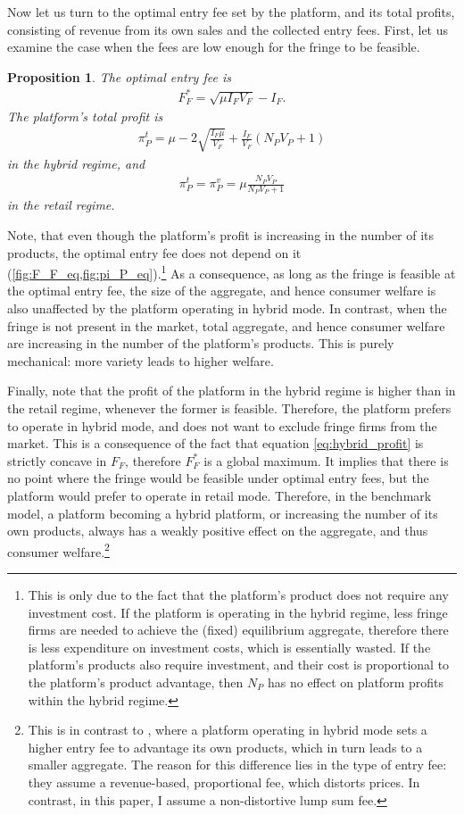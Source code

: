 \documentclass[a4paper]{article}
\newtheorem{proposition}{Proposition}
\begin{document}
Now let us turn to the optimal entry fee set by the platform, and its total profits, consisting of revenue from its own sales and the collected entry fees.
First, let us examine the case when the fees are low enough for the fringe to be feasible.

\begin{proposition}
    The optimal entry fee is
    \begin{align*}
        F_F^* = \sqrt{\mu I_F V_F} - I_F.
    \end{align*}
    The platform's total profit is
    \begin{align*}
        \pi_P^{t} = \mu - 2\sqrt{\frac{I_F \mu}{V_F}} + \frac{I_F}{V_F} (N_P V_P + 1)
    \end{align*}
    in the hybrid regime, and
    \begin{align*}
        \pi_P^{t} = \pi_P^{v} = \mu \frac{ N_P V_P}{N_P V_P + 1}
    \end{align*}
    in the retail regime.
\end{proposition}
Note, that even though the platform's profit is increasing in the number of its products, the optimal entry fee does not depend on it (\cref{fig:F_F_eq,fig:pi_P_eq}).\footnote{
    This is only due to the fact that the platform's product does not require any investment cost.
    If the platform is operating in the hybrid regime, less fringe firms are needed to achieve the (fixed) equilibrium aggregate, therefore there is less expenditure on investment costs, which is essentially wasted.
    If the platform's products also require investment, and their cost is proportional to the platform's product advantage, then $N_P$ has no effect on platform profits within the hybrid regime.
}
As a consequence, as long as the fringe is feasible at the optimal entry fee, the size of the aggregate, and hence consumer welfare is also unaffected by the platform operating in hybrid mode.
In contrast, when the fringe is not present in the market, total aggregate, and hence consumer welfare are increasing in the number of the platform's products.
This is purely mechanical: more variety leads to higher welfare.

Finally, note that the profit of the platform in the hybrid regime is higher than in the retail regime, whenever the former is feasible.
Therefore, the platform prefers to operate in hybrid mode, and does not want to exclude fringe firms from the market.
This is a consequence of the fact that equation \eqref{eq:hybrid_profit} is strictly concave in $F_F$, therefore $F_F^*$ is a global maximum.
It implies that there is no point where the fringe would be feasible under optimal entry fees, but the platform would prefer to operate in retail mode.
Therefore, in the benchmark model, a platform becoming a hybrid platform, or increasing the number of its own products, always has a weakly positive effect on the aggregate, and thus consumer welfare.\footnote{
    This is in contrast to \textcite{anderson2021hybrid}, where a platform operating in hybrid mode sets a higher entry fee to advantage its own products, which in turn leads to a smaller aggregate.
    The reason for this difference lies in the type of entry fee: they assume a revenue-based, proportional fee, which distorts prices.
    In contrast, in this paper, I assume a non-distortive lump sum fee.
}
\end{document}
